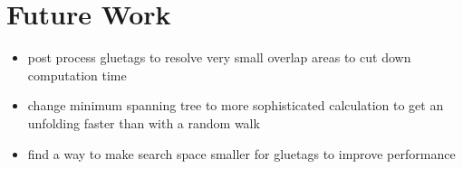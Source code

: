 \documentclass[draft,final]{vutinfth} %
\begin{document}
\section{Future Work}

\begin{itemize}
	\item post process gluetags to resolve very small overlap areas to cut down computation time
	\item change minimum spanning tree to more sophisticated calculation to get an unfolding faster than with a random walk
	\item find a way to make search space smaller for gluetags to improve performance
\end{itemize}

\backmatter

\listoffigures %

\cleardoublepage %
\listoftables %

\listofalgorithms
{}

\printindex

\printglossaries



\end{document}
